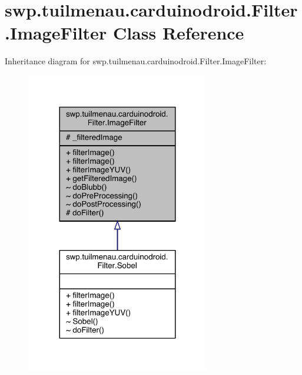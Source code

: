 \hypertarget{classswp_1_1tuilmenau_1_1carduinodroid_1_1_filter_1_1_image_filter}{}\section{swp.\+tuilmenau.\+carduinodroid.\+Filter.\+Image\+Filter Class Reference}
\label{classswp_1_1tuilmenau_1_1carduinodroid_1_1_filter_1_1_image_filter}


Inheritance diagram for swp.\+tuilmenau.\+carduinodroid.\+Filter.\+Image\+Filter\+:
\nopagebreak
\begin{figure}[H]
\begin{center}
\leavevmode
\includegraphics[width=227pt]{classswp_1_1tuilmenau_1_1carduinodroid_1_1_filter_1_1_image_filter__inherit__graph}
\end{center}
\end{figure}


